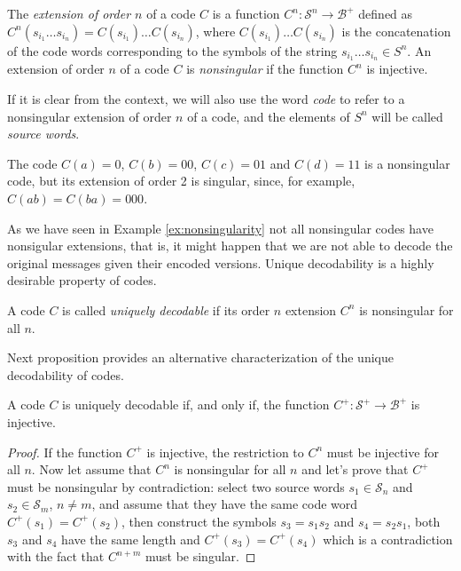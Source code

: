 \begin{definition}
The \emph{extension of order $n$} of a code $C$ is a function $C^{n}:\mathcal{S}^{n}\rightarrow\mathcal{B}^{+}$ defined as $C^{n}(s_{i_1} \ldots s_{i_n}) = C(s_{i_1}) \ldots C(s_{i_n})$, where $C(s_{i_1}) \ldots C(s_{i_n})$ is the concatenation of the code words corresponding to the symbols of the string $s_{i_1} \ldots s_{i_n} \in {S}^{n}$. An extension of order $n$ of a code $C$ is \emph{nonsingular} if the function $C^{n}$ is injective.
\end{definition}

If it is clear from the context, we will also use the word \emph{code} to refer to a nonsingular extension of order $n$ of a code, and the elements of $S^{n}$ will be called \emph{source words}.

\begin{example}
\label{ex:nonsingularity}
The code $C(a)=0$, $C(b)=00$, $C(c)=01$ and $C(d)=11$ is a nonsingular code, but its extension of order 2 is singular, since, for example, $C(ab)=C(ba)=000$.
\end{example}

As we have seen in Example \ref{ex:nonsingularity} not all nonsingular codes have nonsigular extensions, that is, it might happen that we are not able to decode the original messages given their encoded versions. Unique decodability is a highly desirable property of codes.

\begin{definition}
A code $C$ is called \emph{uniquely decodable} if its order $n$ extension $C^{n}$ is nonsingular for all $n$.
\end{definition}

Next proposition provides an alternative characterization of the unique decodability of codes.

\begin{proposition}
A code $C$ is uniquely decodable if, and only if, the function $C^{+}:\mathcal{S}^{+}\rightarrow\mathcal{B}^{+}$ is injective.
\end{proposition}
\begin{proof}
If the function $C^{+}$ is injective, the restriction to $C^{n}$ must be injective for all $n$. Now let assume that $C^{n}$ is nonsingular for all $n$ and let's prove that $C^{+}$ must be nonsingular by contradiction: select two source words $s_{1} \in \mathcal{S}_n$ and $s_{2} \in \mathcal{S}_m$, $n \neq m$, and assume that they have the same code word $C^{+}(s_{1}) = C^{+}(s_{2})$, then construct the symbols $s_{3} = s_{1}s_{2}$ and $s_{4} = s_{2}s_{1}$, both $s_{3}$ and $s_{4}$ have the same length and $C^{+}(s_{3}) = C^{+}(s_{4})$ which is a contradiction with the fact that $C^{n+m}$ must be singular.
\end{proof}

